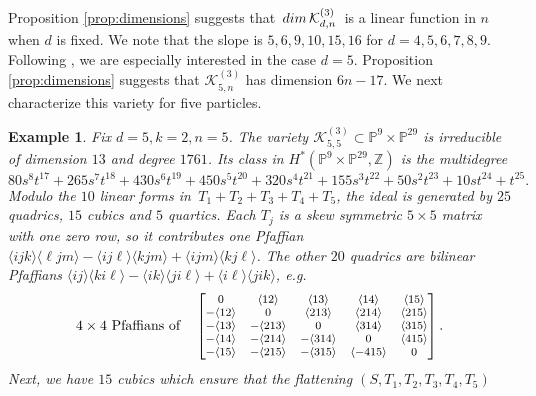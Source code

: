 \documentclass[english]{ourlematema}
\numberwithin{theorem}{section}
\newtheorem{example}[theorem]{Example}
\theoremstyle{definition}
\newcommand{\PP}{\mathbb{P}}
\newcommand{\ZZ}{\mathbb{Z}}
\begin{document}
 Proposition \ref{prop:dimensions} suggests
that $\,{\rm dim}\,\mathcal{K}^{(3)}_{d,n}\,$ is a linear
function in $n$ when $d$ is fixed. We note that the slope is
$5,6,9,10,15,16$ for $d=4,5,6,7,8,9$.
Following \cite{PRRVZ}, we are 
especially interested in the case $d=5$.
Proposition \ref{prop:dimensions} suggests that 
$\mathcal{K}^{(3)}_{5,n}$ has dimension $6n-17$.
We next characterize this variety for five particles.

\begin{example}
Fix $d = 5, k = 2, n = 5$.
The variety $\mathcal{K}^{(3)}_{5,5} \subset \PP^{9} \times \PP^{29}$ is irreducible of dimension $13$ and degree $1761$. Its class in
$H^*(\PP^9 \times \PP^{29},\ZZ)$ is the multidegree
$$
80 s^8 t^{17} \! +   265 s^7 t^{18}  \! +   430 s^6 t^{19}  \!+  450 s^5 t^{20}  \!+   320 s^4 t^{21}
\! +   155 s^3 t^{22}  \!+ 
50 s^2 t^{23} \!+  10 s t^{24}\! +  t^{25}
.$$
Modulo the $10$ linear forms in
$\,T_1 + T_2 + T_3 + T_4 + T_5 $, the ideal is generated by
$25$ quadrics, $15$ cubics and $5$ quartics. 
Each $T_j$ is a skew symmetric $5 \times 5$ matrix with one
zero row, so it contributes one Pfaffian
$
\langle ijk \rangle \langle \ell jm \rangle - \langle ij\ell \rangle \langle k jm \rangle + \langle ijm \rangle \langle k j\ell \rangle
$.
The other $20$ quadrics are bilinear Pfaffians
$
\langle ij \rangle \langle ki\ell \rangle - \langle ik \rangle \langle ji\ell \rangle + \langle i\ell \rangle \langle jik \rangle$, e.g.
\begin{equation}
\label{eq:specialslices1}
 \hbox{$4 \times 4$ Pfaffians of} \quad
\begin{footnotesize}
\begin{bmatrix}
0  & \langle 12 \rangle & \langle 13 \rangle   & \langle 14 \rangle  & \langle 15 \rangle   \\
 -\langle 12 \rangle & 0 & \langle 213 \rangle   & \langle 214 \rangle  & \langle 215 \rangle   \\
 -\langle 13 \rangle & -\langle 213 \rangle  & 0  & \langle 314 \rangle  & \langle 315 \rangle   \\
 -\langle 14 \rangle & -\langle 214 \rangle  & -\langle 314 \rangle & 0  & \langle 415 \rangle   \\
  -\langle 15 \rangle & -\langle 215 \rangle  & -\langle 315 \rangle & \langle -415 \rangle & 0   \\
\end{bmatrix}. \end{footnotesize} 
\end{equation}
Next, we have $15$ cubics which ensure that the  flattening $(S, T_1, T_2, T_3, T_4, T_5)$

\end{example}
\end{document}

